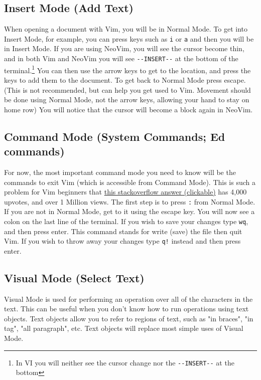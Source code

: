 \documentclass[11pt]{article}
\begin{document}
\subsection{Insert Mode (Add Text)}
\label{sec:orgfc529f4}
When opening a document with Vim, you will be in Normal Mode. To get into Insert
Mode, for example, you can press keys such as \texttt{i} or \texttt{a} and then you will be in
Insert Mode. If you are using NeoVim, you will see the cursor become thin, and
in both Vim and NeoVim you will see \texttt{-{}-INSERT-{}-} at the bottom of the
terminal.\footnote{In VI you will neither see the cursor change nor the \texttt{-{}-INSERT-{}-} at the bottom} You can then use the arrow keys to get to the location, and
press the keys to add them to the document. To get back to Normal Mode press
escape. (This is not recommended, but can help you get used to Vim. Movement
should be done using Normal Mode, not the arrow keys, allowing your hand to stay
on home row) You will notice that the cursor will become a block again in
NeoVim.
\subsection{Command Mode (System Commands; Ed commands)}
\label{sec:orgfb33f88}
For now, the most important command mode you need to know will be the commands
to exit Vim (which is accessible from Command Mode). This is such a problem for
Vim beginners that \href{https://stackoverflow.com/questions/11828270/how-to-exit-the-vim-editor}{this stackoverflow answer (clickable)} has 4,000 upvotes, and
over 1 Million views. The first step is to press \texttt{:} from Normal Mode. If you
are not in Normal Mode, get to it using the escape key. You will now see a colon
on the last line of the terminal. If you wish to save your changes type \texttt{wq},
and then press enter. This command stands for write (save) the file then quit
Vim. If you wish to throw away your changes type \texttt{q!} instead and then press enter.
\subsection{Visual Mode (Select Text)}
\label{sec:org74e83b6}
Visual Mode is used for performing an operation over all of the characters in
the text. This can be useful when you don't know how to run operations using
text objects. Text objects allow you to refer to regions of text, such as "in
braces", "in tag", "all paragraph", etc. Text objects will replace most simple
uses of Visual Mode.
\end{document}
